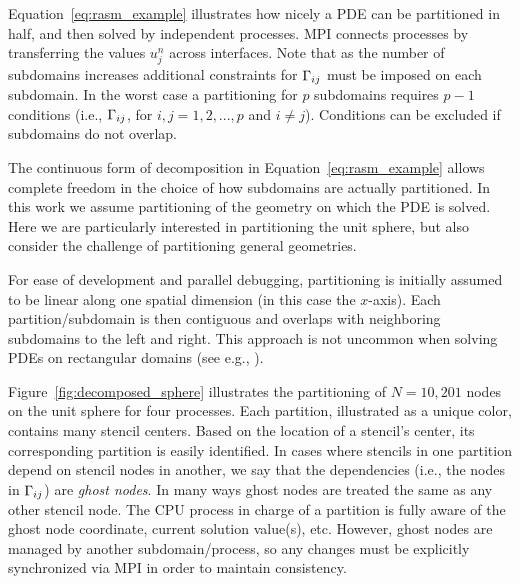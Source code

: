 \documentclass{report}
\begin{document}
Equation~\ref{eq:rasm_example} illustrates how nicely a PDE can be partitioned in half, and then solved by independent processes. MPI connects processes by transferring the values $u_j^{n}$ across interfaces. Note that as the number of subdomains increases additional constraints for $\Gamma_{ij}$ must be imposed on each subdomain. In the worst case a partitioning for $p$ subdomains requires $p-1$ conditions (i.e., $\Gamma_{ij}$, for $i,j=1,2,...,p$ and $i \neq j$). Conditions can be excluded if subdomains do not overlap. 


The continuous form of decomposition in Equation~\ref{eq:rasm_example} allows complete freedom in the choice of how subdomains are actually partitioned. In this work we assume partitioning of the geometry on which the PDE is solved. Here we are particularly interested in partitioning the unit sphere, but also consider the challenge of partitioning general geometries. 

For ease of development and parallel debugging, partitioning is initially
assumed to be linear along one spatial dimension (in this case the $x$-axis). Each partition/subdomain is then contiguous and overlaps with neighboring subdomains to the left and right. This approach is not uncommon when solving PDEs on rectangular domains (see e.g., \cite{Divo2007, Thibault2009}). 


Figure~\ref{fig:decomposed_sphere} illustrates the partitioning of
$N=10,201$ nodes on the unit sphere for four processes. 
Each partition, illustrated as a unique color, contains many stencil centers. 
Based on the location of a stencil's center, its corresponding partition is easily identified. In cases where stencils in one partition depend on stencil nodes in another, we say that the dependencies (i.e., the nodes in $\Gamma_{ij}$) are \emph{ghost nodes}. 
In many ways ghost nodes are treated the same as any other stencil node. The CPU process in charge of a partition is fully aware of the ghost node coordinate, current solution value(s), etc. However, ghost nodes are managed by another subdomain/process, so any changes must be explicitly synchronized via MPI in order to maintain consistency. 
\end{document}

